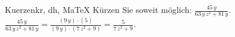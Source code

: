 \begin{MAufgabe}{Kuerzen}{kr, dh, MaTeX}
K\"urzen Sie soweit m\"oglich: $\frac{45\, y}{63\, y\, z^2 + 81\, y}$.\\ 
\ifLsg\MLoesung
\quad $\frac{45\, y}{63\, y\, z^2 + 81\, y}=\frac{(9\, y)\cdot(5)}{(9\, y)\cdot(7\, z^2 + 9)}=\frac{5}{7\, z^2 + 9}$.\else\relax\fi
 \end{MAufgabe}
